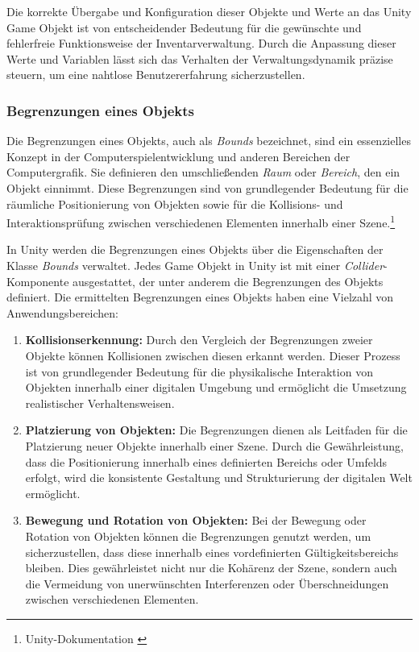 Die korrekte Übergabe und Konfiguration dieser Objekte und Werte an das Unity Game Objekt ist von entscheidender Bedeutung
für die gewünschte und fehlerfreie Funktionsweise der Inventarverwaltung. Durch die Anpassung dieser Werte und Variablen
lässt sich das Verhalten der Verwaltungsdynamik präzise steuern, um eine nahtlose Benutzererfahrung sicherzustellen.

\subsubsection{Begrenzungen eines Objekts}
Die Begrenzungen eines Objekts, auch als \textit{Bounds} bezeichnet, sind ein essenzielles Konzept in der Computerspielentwicklung
und anderen Bereichen der Computergrafik. Sie definieren den umschließenden \textit{Raum} oder \textit{Bereich}, den ein
Objekt einnimmt. Diese Begrenzungen sind von grundlegender Bedeutung für die räumliche Positionierung von Objekten sowie
für die Kollisions- und Interaktionsprüfung zwischen verschiedenen Elementen innerhalb einer Szene.\footnote{Unity-Dokumentation \cite{Bounds}}

In Unity werden die Begrenzungen eines Objekts über die Eigenschaften der Klasse \textit{Bounds} verwaltet. Jedes Game
Objekt in Unity ist mit einer \textit{Collider}-Komponente ausgestattet, der unter anderem die Begrenzungen des Objekts
definiert. Die ermittelten Begrenzungen eines Objekts haben eine Vielzahl von Anwendungsbereichen:

\begin{enumerate}
    \item \textbf{Kollisionserkennung:} Durch den Vergleich der Begrenzungen zweier Objekte können Kollisionen zwischen
    diesen erkannt werden. Dieser Prozess ist von grundlegender Bedeutung für die physikalische Interaktion von Objekten
    innerhalb einer digitalen Umgebung und ermöglicht die Umsetzung realistischer Verhaltensweisen.

    \item \textbf{Platzierung von Objekten:} Die Begrenzungen dienen als Leitfaden für die Platzierung neuer Objekte
    innerhalb einer Szene. Durch die Gewährleistung, dass die Positionierung innerhalb eines definierten Bereichs oder
    Umfelds erfolgt, wird die konsistente Gestaltung und Strukturierung der digitalen Welt ermöglicht.

    \item \textbf{Bewegung und Rotation von Objekten:} Bei der Bewegung oder Rotation von Objekten können die Begrenzungen
    genutzt werden, um sicherzustellen, dass diese innerhalb eines vordefinierten Gültigkeitsbereichs bleiben. Dies
    gewährleistet nicht nur die Kohärenz der Szene, sondern auch die Vermeidung von unerwünschten Interferenzen oder
    Überschneidungen zwischen verschiedenen Elementen.
\end{enumerate}

